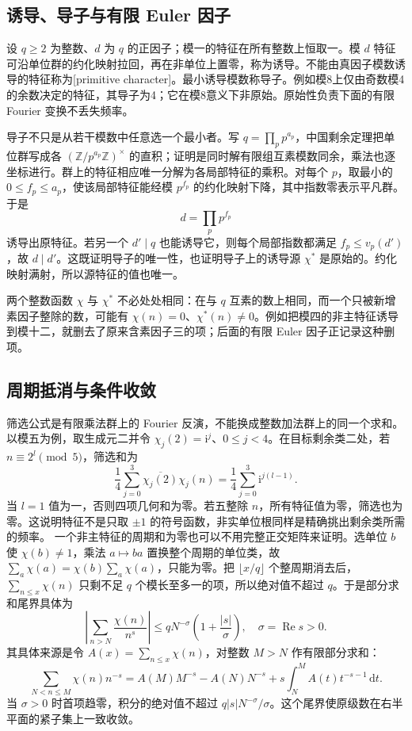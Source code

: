 \subsection{诱导、导子与有限 Euler 因子}
\label{b3:subsec:D0103}

设 \(q\ge2\) 为整数、\(d\) 为 \(q\) 的正因子；模一的特征在所有整数上恒取一。模 \(d\) 特征可沿单位群的约化映射拉回，再在非单位上置零，称为诱导。不能由真因子模数诱导的特征称为[primitive character]。最小诱导模数称导子。例如模8上仅由奇数模4的余数决定的特征，其导子为4；它在模8意义下非原始。原始性负责下面的有限 Fourier 变换不丢失频率。

\ProseParagraphBreak
导子不只是从若干模数中任意选一个最小者。写 \(q=\prod_p p^{a_p}\)，中国剩余定理把单位群写成各 \((\mathbb Z/p^{a_p}\mathbb Z)^\times\) 的直积；证明是同时解有限组互素模数同余，乘法也逐坐标进行。群上的特征相应唯一分解为各局部特征的乘积。对每个 \(p\)，取最小的 \(0\le f_p\le a_p\)，使该局部特征能经模 \(p^{f_p}\) 的约化映射下降，其中指数零表示平凡群。于是
\[
 d=\prod_p p^{f_p}
\]
诱导出原特征。若另一个 \(d'\mid q\) 也能诱导它，则每个局部指数都满足 \(f_p\le v_p(d')\)，故 \(d\mid d'\)。这既证明导子的唯一性，也证明导子上的诱导源 \(\chi^*\) 是原始的。约化映射满射，所以源特征的值也唯一。

两个整数函数 \(\chi\) 与 \(\chi^*\) 不必处处相同：在与 \(q\) 互素的数上相同，而一个只被新增素因子整除的数，可能有 \(\chi(n)=0\)、\(\chi^*(n)\ne0\)。例如把模四的非主特征诱导到模十二，就删去了原来含素因子三的项；后面的有限 Euler 因子正记录这种删项。

\subsection{周期抵消与条件收敛}
\label{b3:subsec:D0104}

筛选公式是有限乘法群上的 Fourier 反演，不能换成整数加法群上的同一个求和。以模五为例，取生成元二并令 \(\chi_j(2)=\mathrm{i}^j\)、\(0\le j<4\)。在目标剩余类二处，若 \(n\equiv2^l\pmod5\)，筛选和为
\[
 \frac14\sum_{j=0}^3\overline{\chi_j(2)}\chi_j(n)
 =\frac14\sum_{j=0}^3\mathrm{i}^{j(l-1)}.
\]
当 \(l=1\) 值为一，否则四项几何和为零。若五整除 \(n\)，所有特征值为零，筛选也为零。这说明特征不是只取 \(\pm1\) 的符号函数，非实单位根同样是精确挑出剩余类所需的频率。
\ProseParagraphBreak
一个非主特征的周期和为零也可以不用完整正交矩阵来证明。选单位 \(b\) 使 \(\chi(b)\ne1\)，乘法 \(a\mapsto ba\) 置换整个周期的单位类，故 \(\sum_a\chi(a)=\chi(b)\sum_a\chi(a)\)，只能为零。把 \(\lfloor x/q\rfloor\) 个整周期消去后，\(\sum_{n\le x}\chi(n)\) 只剩不足 \(q\) 个模长至多一的项，所以绝对值不超过 \(q\)。于是部分求和尾界具体为
\[
 \left|\sum_{n>N}\frac{\chi(n)}{n^s}\right|
 \le q N^{-\sigma}\left(1+\frac{|s|}{\sigma}\right),\quad\sigma=\operatorname{Re}s>0.
\]
其具体来源是令 \(A(x)=\sum_{n\le x}\chi(n)\)，对整数 \(M>N\) 作有限部分求和：
\[
 \sum_{N<n\le M}\chi(n)n^{-s}
 =A(M)M^{-s}-A(N)N^{-s}
   +s\int_N^M A(t)t^{-s-1}\,\mathrm{d}t.
\]
当 \(\sigma>0\) 时首项趋零，积分的绝对值不超过 \(q|s|N^{-\sigma}/\sigma\)。这个尾界使原级数在右半平面的紧子集上一致收敛。

